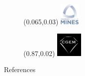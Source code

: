 \documentclass[light]{cgem-presentation}
\begin{document}
  \begin{frame}[plain]
    \begin{figure}
      \begin{textblock*}{1cm}(0.065\paperwidth,0.03\paperheight)
        \includegraphics[width=1cm]{mines-2018}
      \end{textblock*}
    \end{figure}
    \begin{figure}
      \begin{textblock*}{1cm}(0.87\paperwidth,0.02\paperheight)
        \includegraphics[width=1.3cm]{cgem-logo}
      \end{textblock*}
    \end{figure}
    \makequestion{-8mm}{-2mm}{1.75cm}{1.82cm}{1mm}
  \end{frame}

  \begin{frame}{References}
    \printbibliography
  \end{frame}
\end{document}
